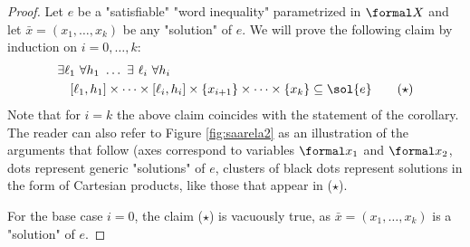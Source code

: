 \documentclass{theoretics}
\begin{document}
\begin{proof}
Let $e$ be a "satisfiable" "word inequality" parametrized in $\formal X$ and
let $\bar x = (x_1,\dots,x_k)$ be any "solution" of $e$.
We will prove the following claim by induction on $i=0,\dots,k$:
\begin{align*}
 & \exists \ell_1 ~ \forall h_1 ~ \dots ~ \exists ~ \ell_i ~ \forall h_i\\
 & \quad
 [\ell_1,h_1]\times\cdots\times[\ell_i,h_i]\times\{x_{i+1}\}\times\dots\times\{x_k\} \subseteq \sol{e}
 \tag{$\star$}
\end{align*}
Note that for $i=k$ the above claim coincides with the statement of the corollary.
The reader can also refer to Figure \ref{fig:saarela2} as an illustration 
of the arguments that follow (axes correspond to variables $\formal x_1$ 
and $\formal x_2$, dots represent generic "solutions" of $e$, 
clusters of black dots represent solutions in the form of Cartesian products,
like those that appear in ($\star$).

For the base case $i=0$, the claim ($\star$) is vacuously true, as $\bar x=(x_1,\dots,x_k)$
is a "solution" of $e$.


\end{proof}
\end{document}
